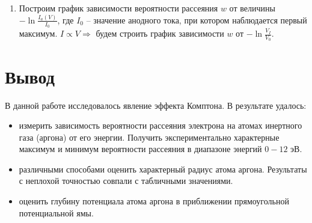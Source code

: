\documentclass[a4paper,12pt]{article}
\begin{document}
\begin{enumerate}
    \item 
    Построим график зависимости вероятности рассеяния $w$ от величины $-\ln\frac{I_a(V)}{I_0}$, где $I_0$ -- значение анодного тока, при котором наблюдается первый максимум. $I \propto V \Rightarrow$ будем строить график зависимости $w$ от $-\ln\frac{V_I}{V_0}$.
    
\end{enumerate}

\section{Вывод}
В данной работе исследовалось явление эффекта Комптона. В результате удалось:
\begin{itemize}
    \item
    измерить зависимость вероятности рассеяния электрона на атомах инертного газа (аргона) от его энергии. Получить экспериментально характерные максимум и минимум вероятности рассеяния в диапазоне энергий $0-12$ эВ.
    
    \item
    различными способами оценить характерный радиус атома аргона. Результаты с неплохой точностью совпали с табличными значениями.

    \item
    оценить глубину потенциала атома аргона в приближении прямоугольной потенциальной ямы.
    
\end{itemize}
\end{document}
